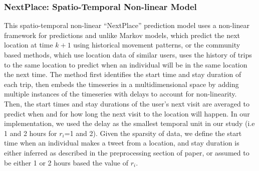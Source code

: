 \subsubsection{NextPlace: Spatio-Temporal Non-linear Model}
This spatio-temporal non-linear ``NextPlace'' prediction model uses a non-linear framework for predictions and unlike Markov models, which predict the next location at time $k+1$ using historical movement patterns, or the community based methods, which use location data of similar users, 
uses the history of trips to the same location to predict when an individual will be in the same location the next time. \cite{136} 
The method first identifies the start time and stay duration of each trip, then embeds the timeseries in a multidimensional space by adding multiple instances of the timeseries with delays to account for non-linearity. Then, the start times and stay durations of the user's next visit are averaged to predict when and for how long the next visit to the location will happen. In our implementation, we used the delay as the smallest temporal unit in our study (i.e 1 and 2 hours for $r_i$=1 and 2). Given the sparsity of data, we define the start time when an individual makes a tweet from a location, and stay duration is either inferred as described in the preprocessing section of paper, or assumed to be either 1 or 2 hours based the value of $r_i$.


